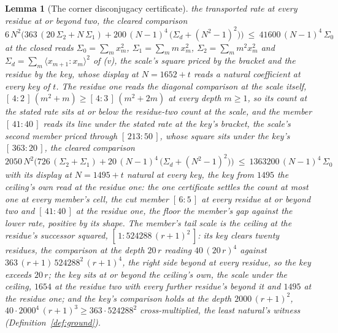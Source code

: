 \documentclass[11pt]{article}
\newtheorem{lemma}{Lemma}
\theoremstyle{definition}
\begin{document}
\begin{lemma}[The corner disconjugacy certificate]
the transported rate at every residue at or beyond two, the cleared
comparison
\[
6\,N^{2}\Big(363\,(20\,\Sigma_{2}+N\,\Sigma_{1})
+200\,(N{-}1)^{4}\,\big(\Sigma_{d}+(N^{2}{-}1)^{2}\big)\Big)
\ \le\ 41600\,(N{-}1)^{4}\,\Sigma_{0}
\]
at the closed reads $\Sigma_{0}=\sum_m x_m^{2}$,
$\Sigma_{1}=\sum_m m\,x_m^{2}$, $\Sigma_{2}=\sum_m m^{2}x_m^{2}$
and $\Sigma_{d}=\sum_m\langle x_{m+1}\!:\!x_m\rangle^{2}$ of (v),
the scale's square priced by the bracket and the residue by the
key, whose display at $N=1652+t$ reads a natural coefficient at
every key of $t$. The residue one reads the diagonal comparison at
the scale itself, $[\,4:2\,]\,(m^{2}+m)\ge[\,4:3\,]\,(m^{2}+2m)$ at
every depth $m\ge1$, so its count at the stated rate sits at or
below the residue-two count at the scale, and the member
$[\,41:40\,]$ reads its line under the stated rate at the key's
bracket, the scale's second member priced through $[\,213:50\,]$,
whose square sits under the key's $[\,363:20\,]$, the cleared
comparison
\[
2050\,N^{2}\Big(726\,(\Sigma_{2}+\Sigma_{1})
+20\,(N{-}1)^{4}\,\big(\Sigma_{d}+(N^{2}{-}1)^{2}\big)\Big)
\ \le\ 1363200\,(N{-}1)^{4}\,\Sigma_{0}
\]
with its display at $N=1495+t$ natural at every key, the key from
$1495$ the ceiling's own read at the residue one: the one
certificate settles the count at most one at every member's cell,
the cut member $[\,6:5\,]$ at every residue at or beyond two and
$[\,41:40\,]$ at the residue one, the floor the member's gap
against the lower rate, positive by its shape. The member's tail
scale is the ceiling at the residue's successor squared,
$[\,1:524288\,(r+1)^{2}\,]$: its key clears twenty residues, the
comparison at the depth $20\,r$ reading $40\,(20\,r)^{4}$ against
$363\,(r+1)\,524288^{2}\,(r+1)^{4}$, the right side beyond at every
residue, so the key exceeds $20\,r$; the key sits at or beyond the
ceiling's own, the scale under the ceiling, $1654$ at the residue
two with every further residue's beyond it and $1495$ at the
residue one; and the key's comparison holds at the depth
$2000\,(r+1)^{2}$, $40\cdot2000^{4}\,(r+1)^{3}\ge363\cdot524288^{2}$
cross-multiplied, the least natural's witness
(Definition~\ref{def:ground}).


\end{lemma}
\end{document}
